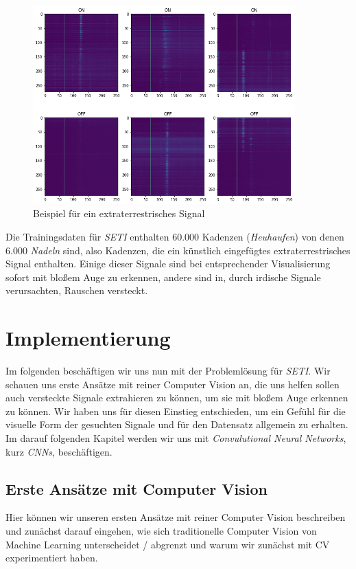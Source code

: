 \documentclass[11pt, a4paper]{article}
\begin{document}
\begin{figure}[t]
\centering
\includegraphics[width=0.9\textwidth]{"img/kadenz_pos_1.png"}
\caption{Beispiel für ein extraterrestrisches Signal}
\label{fig:kadenz_pos_1}
\end{figure}

Die Trainingsdaten für \emph{SETI} enthalten 60.000 Kadenzen (\emph{Heuhaufen}) von denen 6.000 \emph{Nadeln} sind, also Kadenzen, die ein künstlich eingefügtes extraterrestrisches Signal enthalten. Einige dieser Signale sind bei entsprechender Visualisierung sofort mit bloßem Auge zu erkennen, andere sind in, durch irdische Signale verursachten, Rauschen versteckt.


\section{Implementierung}
Im folgenden beschäftigen wir uns nun mit der Problemlösung für \emph{SETI}. Wir schauen uns erste Ansätze mit reiner Computer Vision an, die uns helfen sollen auch versteckte Signale extrahieren zu können, um sie mit bloßem Auge erkennen zu können. Wir haben uns für diesen Einstieg entschieden, um ein Gefühl für die visuelle Form der gesuchten Signale und für den Datensatz allgemein zu erhalten. Im darauf folgenden Kapitel werden wir uns mit \emph{Convulutional Neural Networks}, kurz \emph{CNNs}, beschäftigen.

\subsection{Erste Ansätze mit Computer Vision}
Hier können wir unseren ersten Ansätze mit reiner Computer Vision beschreiben und zunächst darauf eingehen, wie sich traditionelle Computer Vision von Machine Learning unterscheidet / abgrenzt und warum wir zunächst mit CV experimentiert haben.
\end{document}
